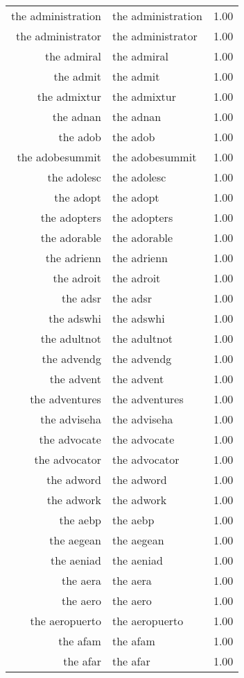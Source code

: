 \begin{table}[ht]
\begin{tabular}{rlr}
  the administration & the administration & 1.00 \\ 
  the administrator & the administrator & 1.00 \\ 
  the admiral & the admiral & 1.00 \\ 
  the admit & the admit & 1.00 \\ 
  the admixtur & the admixtur & 1.00 \\ 
  the adnan & the adnan & 1.00 \\ 
  the adob & the adob & 1.00 \\ 
  the adobesummit & the adobesummit & 1.00 \\ 
  the adolesc & the adolesc & 1.00 \\ 
  the adopt & the adopt & 1.00 \\ 
  the adopters & the adopters & 1.00 \\ 
  the adorable & the adorable & 1.00 \\ 
  the adrienn & the adrienn & 1.00 \\ 
  the adroit & the adroit & 1.00 \\ 
  the adsr & the adsr & 1.00 \\ 
  the adswhi & the adswhi & 1.00 \\ 
  the adultnot & the adultnot & 1.00 \\ 
  the advendg & the advendg & 1.00 \\ 
  the advent & the advent & 1.00 \\ 
  the adventures & the adventures & 1.00 \\ 
  the adviseha & the adviseha & 1.00 \\ 
  the advocate & the advocate & 1.00 \\ 
  the advocator & the advocator & 1.00 \\ 
  the adword & the adword & 1.00 \\ 
  the adwork & the adwork & 1.00 \\ 
  the aebp & the aebp & 1.00 \\ 
  the aegean & the aegean & 1.00 \\ 
  the aeniad & the aeniad & 1.00 \\ 
  the aera & the aera & 1.00 \\ 
  the aero & the aero & 1.00 \\ 
  the aeropuerto & the aeropuerto & 1.00 \\ 
  the afam & the afam & 1.00 \\ 
  the afar & the afar & 1.00 \\ 

\end{tabular}
\end{table}
